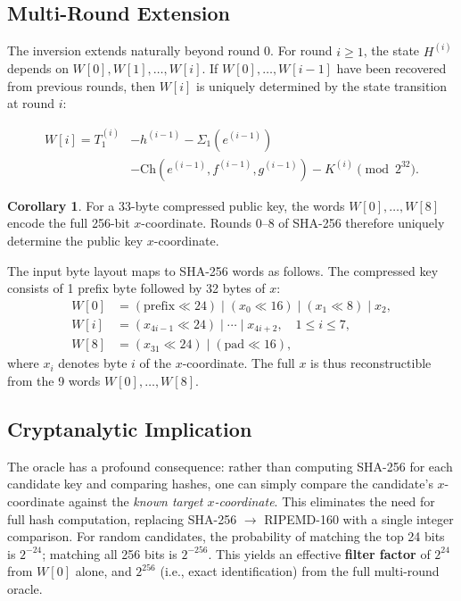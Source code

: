 \documentclass[11pt,a4paper]{article}
\theoremstyle{definition}
\newtheorem{corollary}[theorem]{Corollary}
\begin{document}
\subsection{Multi-Round Extension}

The inversion extends naturally beyond round 0. For round $i \geq 1$, the state $H^{(i)}$ depends on $W[0], W[1], \ldots, W[i]$. If $W[0], \ldots, W[i-1]$ have been recovered from previous rounds, then $W[i]$ is uniquely determined by the state transition at round $i$:

\begin{equation}
\begin{split}
W[i] = T_1^{(i)} &- h^{(i-1)} - \Sigma_1(e^{(i-1)}) \\
&- \mathrm{Ch}(e^{(i-1)}, f^{(i-1)}, g^{(i-1)}) - K^{(i)} \pmod{2^{32}}.
\end{split}
\end{equation}

\begin{corollary}
For a 33-byte compressed public key, the words $W[0], \ldots, W[8]$ encode the full 256-bit $x$-coordinate. Rounds 0--8 of SHA-256 therefore uniquely determine the public key $x$-coordinate.
\end{corollary}

The input byte layout maps to SHA-256 words as follows. The compressed key consists of 1 prefix byte followed by 32 bytes of $x$:
\begin{align}
W[0] &= (\text{prefix} \ll 24) \mid (x_{0} \ll 16) \mid (x_{1} \ll 8) \mid x_{2}, \\
W[i] &= (x_{4i-1} \ll 24) \mid \cdots \mid x_{4i+2}, \quad 1 \leq i \leq 7, \\
W[8] &= (x_{31} \ll 24) \mid (\text{pad} \ll 16),
\end{align}
where $x_i$ denotes byte $i$ of the $x$-coordinate. The full $x$ is thus reconstructible from the 9 words $W[0], \ldots, W[8]$.

\subsection{Cryptanalytic Implication}

The oracle has a profound consequence: rather than computing SHA-256 for each candidate key and comparing hashes, one can simply compare the candidate's $x$-coordinate against the \textit{known target $x$-coordinate}. This eliminates the need for full hash computation, replacing SHA-256 $\to$ RIPEMD-160 with a single integer comparison. For random candidates, the probability of matching the top 24 bits is $2^{-24}$; matching all 256 bits is $2^{-256}$. This yields an effective \textbf{filter factor} of $2^{24}$ from $W[0]$ alone, and $2^{256}$ (i.e., exact identification) from the full multi-round oracle.
\end{document}
